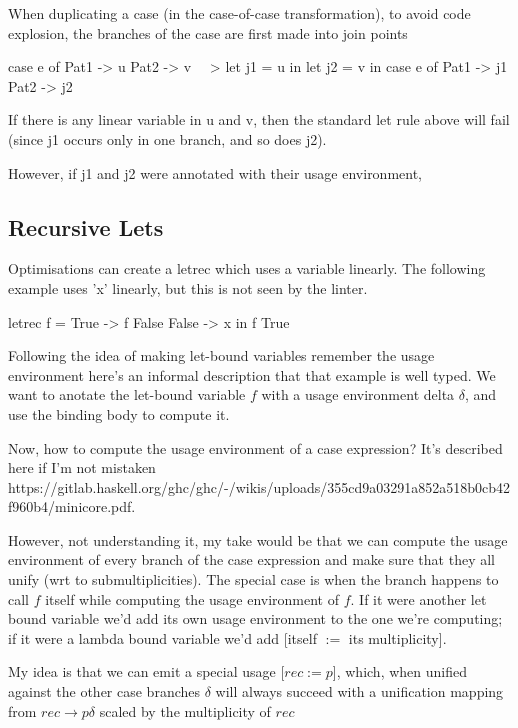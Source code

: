 \documentclass[a4paper, draft]{article}
\begin{document}
When duplicating a case (in the case-of-case transformation), to avoid code
explosion, the branches of the case are first made into join points

\begin{code}
case e of
  Pat1 -> u
  Pat2 -> v
~~>
let j1 = u in
let j2 = v in
case e of
  Pat1 -> j1
  Pat2 -> j2
\end{code}

If there is any linear variable in u and v, then the standard
let rule above will fail (since j1 occurs only in one branch, and
so does j2).

However, if j1 and j2 were annotated with their usage environment,

\subsection{Recursive Lets}

Optimisations can create a letrec which uses a variable linearly. The following
example uses 'x' linearly, but this is not seen by the linter.
\begin{code}
letrec f = \case
        True -> f False
        False -> x
in f True
\end{code}

Following the idea of making let-bound variables remember the usage environment
here's an informal description that that example is well typed. We want to
anotate the let-bound variable $f$ with a usage environment delta $\delta$, and
use the binding body to compute it.

Now, how to compute the usage environment of a case expression? It's described
here if I'm not mistaken
https://gitlab.haskell.org/ghc/ghc/-/wikis/uploads/355cd9a03291a852a518b0cb42f960b4/minicore.pdf.

However, not understanding it, my take would be that we can compute the usage
environment of every branch of the case expression and make sure that they all
unify (wrt to submultiplicities). The special case is when the branch happens to
call $f$ itself while computing the usage environment of $f$. If it were another
let bound variable we'd add its own usage environment to the one we're
computing; if it were a lambda bound variable we'd add [itself $:=$ its
multiplicity].

My idea is that we can emit a special usage [$rec := p$], which, when unified
against the other case branches $\delta$ will always succeed with a unification
mapping from $rec \rightarrow p\delta$ scaled by the multiplicity of $rec$
\end{document}
